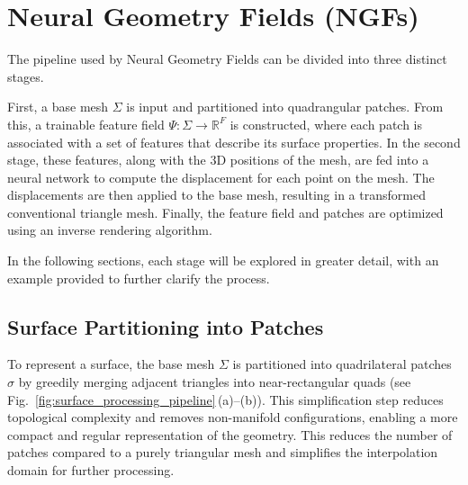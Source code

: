 \section{Neural Geometry Fields (NGFs)}\label{Sec:MainPart}

The pipeline used by Neural Geometry Fields can be divided into three distinct stages. 

First, a base mesh $\Sigma$ is input and partitioned into quadrangular patches. 
From this, a trainable feature field $\Psi : \Sigma \rightarrow \mathbb{R}^F$ is constructed, where each patch is associated with a set of features that describe its surface properties. 
In the second stage, these features, along with the 3D positions of the mesh, are fed into a neural network to compute the displacement for each point on the mesh. 
The displacements are then applied to the base mesh, resulting in a transformed conventional triangle mesh. 
Finally, the feature field and patches are optimized using an inverse rendering algorithm. 

In the following sections, each stage will be explored in greater detail, with an example provided to further clarify the process. 





\subsection{Surface Partitioning into Patches}

To represent a surface, the base mesh $\Sigma$ is partitioned into quadrilateral patches $\sigma$ by greedily merging adjacent triangles into near-rectangular quads (see Fig.~\ref{fig:surface_processing_pipeline}\,(a)--(b)). 
This simplification step reduces topological complexity and removes non-manifold configurations, enabling a more compact and regular representation of the geometry. 
This reduces the number of patches compared to a purely triangular mesh and simplifies the interpolation domain for further processing. 






